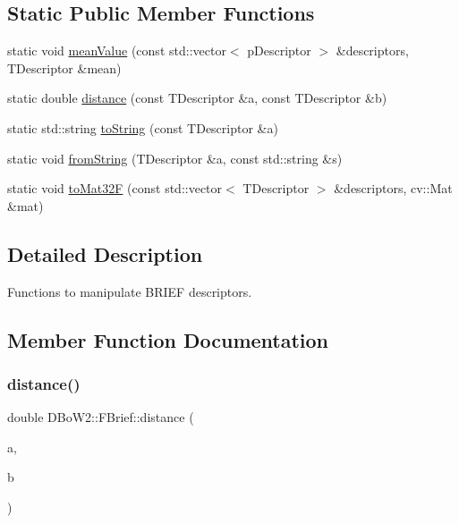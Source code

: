 \subsection*{Static Public Member Functions}
\begin{DoxyCompactItemize}
\item 
static void \hyperlink{classDBoW2_1_1FBrief_a2808910daf6af046b47925715d71b564}{mean\+Value} (const std\+::vector$<$ p\+Descriptor $>$ \&descriptors, T\+Descriptor \&mean)
\item 
static double \hyperlink{classDBoW2_1_1FBrief_adc1c516cc0a2c9847853653956e8c35a}{distance} (const T\+Descriptor \&a, const T\+Descriptor \&b)
\item 
static std\+::string \hyperlink{classDBoW2_1_1FBrief_a271da94381cfb7a39664e5fc1d32a476}{to\+String} (const T\+Descriptor \&a)
\item 
static void \hyperlink{classDBoW2_1_1FBrief_a05bb35b06cc95b41edc80640ef2ea9f5}{from\+String} (T\+Descriptor \&a, const std\+::string \&s)
\item 
static void \hyperlink{classDBoW2_1_1FBrief_a626d885be78dfe839083b2ffb220150d}{to\+Mat32F} (const std\+::vector$<$ T\+Descriptor $>$ \&descriptors, cv\+::\+Mat \&mat)
\end{DoxyCompactItemize}


\subsection{Detailed Description}
Functions to manipulate B\+R\+I\+EF descriptors. 

\subsection{Member Function Documentation}
\mbox{\label{classDBoW2_1_1FBrief_adc1c516cc0a2c9847853653956e8c35a}} 
\subsubsection{\texorpdfstring{distance()}{distance()}}
{\footnotesize\ttfamily double D\+Bo\+W2\+::\+F\+Brief\+::distance (\begin{DoxyParamCaption}\item[{const T\+Descriptor \&}]{a,  }\item[{const T\+Descriptor \&}]{b }\end{DoxyParamCaption})\hspace{0.3cm}{\ttfamily [static]}}

